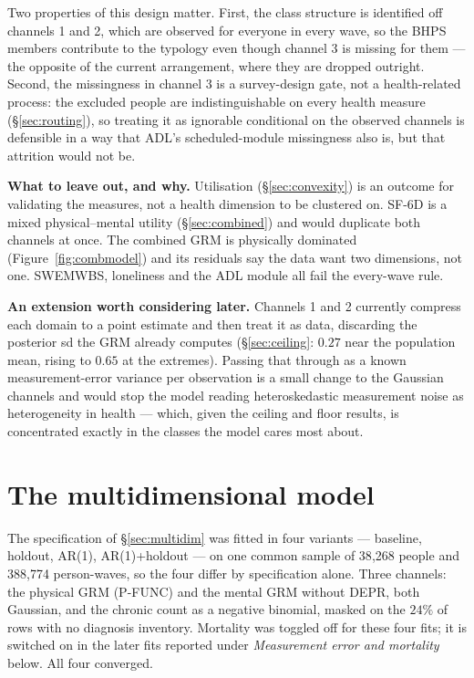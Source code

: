 \documentclass[11pt]{article}
\begin{document}
Two properties of this design matter. First, the class structure is
identified off channels 1 and 2, which are observed for everyone in every
wave, so the BHPS members contribute to the typology even though channel 3 is
missing for them --- the opposite of the current arrangement, where they are
dropped outright. Second, the missingness in channel 3 is a survey-design
gate, not a health-related process: the excluded people are indistinguishable
on every health measure (\S\ref{sec:routing}), so treating it as ignorable
conditional on the observed channels is defensible in a way that ADL's
scheduled-module missingness also is, but that attrition would not be.

\textbf{What to leave out, and why.} Utilisation (\S\ref{sec:convexity}) is
an outcome for validating the measures, not a health dimension to be
clustered on. SF-6D is a mixed physical--mental utility
(\S\ref{sec:combined}) and would duplicate both channels at once. The
combined GRM is physically dominated (Figure~\ref{fig:combmodel}) and its
residuals say the data want two dimensions, not one. SWEMWBS, loneliness and
the ADL module all fail the every-wave rule.

\textbf{An extension worth considering later.} Channels 1 and 2 currently
compress each domain to a point estimate and then treat it as data, discarding
the posterior sd the GRM already computes (\S\ref{sec:ceiling}: $0.27$ near
the population mean, rising to $0.65$ at the extremes). Passing that through
as a known measurement-error variance per observation is a small change to
the Gaussian channels and would stop the model reading heteroskedastic
measurement noise as heterogeneity in health --- which, given the ceiling and
floor results, is concentrated exactly in the classes the model cares most
about.

\section{The multidimensional model}
\label{sec:multifit}

The specification of \S\ref{sec:multidim} was fitted in four variants ---
baseline, holdout, AR(1), AR(1)+holdout --- on one common sample of 38{,}268
people and 388{,}774 person-waves, so the four differ by specification alone.
Three channels: the physical GRM (P-FUNC) and the mental GRM without DEPR,
both Gaussian, and the chronic count as a negative binomial, masked on the
$24\%$ of rows with no diagnosis inventory. Mortality was toggled off for
these four fits; it is switched on in the later fits reported under
\emph{Measurement error and mortality} below. All four converged.
\end{document}
